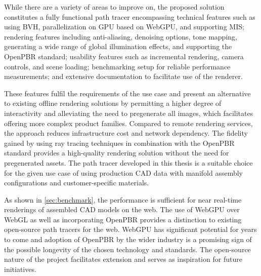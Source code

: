 While there are a variety of areas to improve on, the proposed solution constitutes a fully functional path tracer encompassing technical features such as using \gls{BVH}, parallelization on \gls{GPU} based on \gls{WebGPU}, and supporting \gls{MIS}; rendering features including anti-aliasing, denoising options, tone mapping, generating a wide range of global illumination effects, and supporting the \gls{OpenPBR} standard; usability features such as incremental rendering, camera controls, and scene loading; benchmarking setup for reliable performance measurements; and extensive documentation to facilitate use of the renderer.

These features fulfil the requirements of the use case and present an alternative to existing offline rendering solutions by permitting a higher degree of interactivity and alleviating the need to pregenerate all images, which facilitates offering more complex product families. Compared to remote rendering services, the approach reduces infrastructure cost and network dependency. The fidelity gained by using ray tracing techniques in combination with the \gls{OpenPBR} standard provides a high-quality rendering solution without the need for pregenerated assets. The path tracer developed in this thesis is a suitable choice for the given use case of using production \gls{CAD} data with manifold assembly configurations and customer-specific materials.

As shown in \autoref{sec:benchmark}, the performance is sufficient for near real-time renderings of assembled \gls{CAD} models on the web. The use of \gls{WebGPU} over \gls{WebGL} as well as incorporating \gls{OpenPBR} provides a distinction to existing open-source path tracers for the web. \gls{WebGPU} has significant potential for years to come and adoption of \gls{OpenPBR} by the wider industry is a promising sign of the possible longevity of the chosen technology and standards. The open-source nature of the project facilitates extension and serves as inspiration for future initiatives.
